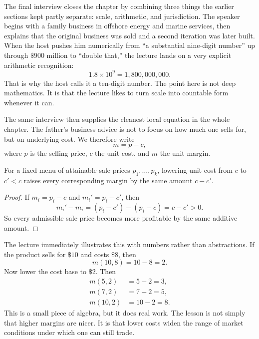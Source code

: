 The final interview closes the chapter by combining three things the earlier sections kept partly separate: scale, arithmetic, and jurisdiction. The speaker begins with a family business in offshore energy and marine services, then explains that the original business was sold and a second iteration was later built. When the host pushes him numerically from ``a substantial nine-digit number'' up through \(\$900\) million to ``double that,'' the lecture lands on a very explicit arithmetic recognition:
\begin{equation}
1.8\times 10^9 = 1{,}800{,}000{,}000.
\end{equation}
That is why the host calls it a ten-digit number. The point here is not deep mathematics. It is that the lecture likes to turn scale into countable form whenever it can.

The same interview then supplies the cleanest local equation in the whole chapter. The father's business advice is not to focus on how much one sells for, but on underlying cost. We therefore write
\begin{equation}
m=p-c,
\end{equation}
where \(p\) is the selling price, \(c\) the unit cost, and \(m\) the unit margin.

\begin{proposition}
For a fixed menu of attainable sale prices \(p_1,\dots,p_k\), lowering unit cost from \(c\) to \(c'<c\) raises every corresponding margin by the same amount \(c-c'\).
\end{proposition}

\begin{proof}
If \(m_i=p_i-c\) and \(m_i'=p_i-c'\), then
\[
m_i'-m_i = (p_i-c')-(p_i-c)=c-c'>0.
\]
So every admissible sale price becomes more profitable by the same additive amount.
\end{proof}

The lecture immediately illustrates this with numbers rather than abstractions. If the product sells for \(\$10\) and costs \(\$8\), then
\begin{equation}
m(10,8)=10-8=2.
\end{equation}
Now lower the cost base to \(\$2\). Then
\begin{align}
m(5,2)&=5-2=3,\\
m(7,2)&=7-2=5,\\
m(10,2)&=10-2=8.
\end{align}
This is a small piece of algebra, but it does real work. The lesson is not simply that higher margins are nicer. It is that lower costs widen the range of market conditions under which one can still trade.

